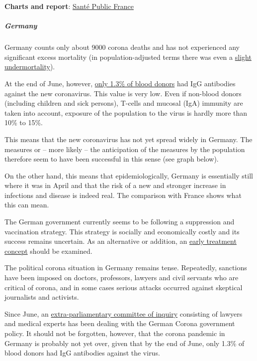 \textbf{Charts and report}:
\href{https://www.santepubliquefrance.fr/maladies-et-traumatismes/maladies-et-infections-respiratoires/infection-a-coronavirus/documents/rapport-synthese/surveillance-de-la-mortalite-au-cours-de-l-epidemie-de-covid-19-du-2-mars-au-31-mai-2020-en-france}{Santé
Public France}

\hypertarget{germany}{%
\subparagraph{\texorpdfstring{\textbf{Germany}}{Germany}}\label{germany}}

Germany counts only about 9000 corona deaths and has not experienced any
significant excess mortality (in population-adjusted terms there was
even a
\href{https://swprs.files.wordpress.com/2020/06/breyer-deutschland-untersterblichkeit.pdf}{slight
undermortality}).

At the end of June, however,
\href{https://www.rki.de/DE/Content/InfAZ/N/Neuartiges_Coronavirus/Projekte_RKI/SeBluCo_Zwischenbericht.html}{only
1.3\% of blood donors} had IgG antibodies against the new coronavirus.
This value is very low. Even if non-blood donors (including children and
sick persons), T-cells and mucosal (IgA) immunity are taken into
account, exposure of the population to the virus is hardly more than
10\% to 15\%.

This means that the new coronavirus has not yet spread widely in
Germany. The measures or -- more likely -- the anticipation of the
measures by the population therefore seem to have been successful in
this sense (see graph below).

On the other hand, this means that epidemiologically, Germany is
essentially still where it was in April and that the risk of a new and
stronger increase in infections and disease is indeed real. The
comparison with France shows what this can mean.

The German government currently seems to be following a suppression and
vaccination strategy. This strategy is socially and economically costly
and its success remains uncertain. As an alternative or addition, an
\href{https://swprs.org/on-the-treatment-of-covid-19/}{early treatment
concept} should be examined.

The political corona situation in Germany remains tense. Repeatedly,
sanctions have been imposed on doctors, professors, lawyers and civil
servants who are critical of corona, and in some cases serious attacks
occurred against skeptical journalists and activists.

Since June, an \href{https://corona-ausschuss.de/}{extra-parliamentary
committee of inquiry} consisting of lawyers and medical experts has been
dealing with the German Corona government policy. It should not be
forgotten, however, that the corona pandemic in Germany is probably not
yet over, given that by the end of June, only 1.3\% of blood donors had
IgG antibodies against the virus.

